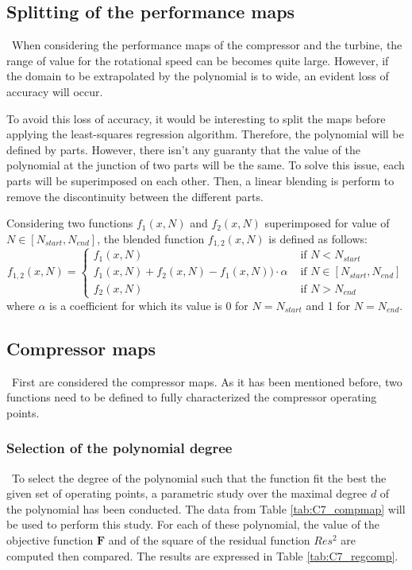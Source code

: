 \subsection{Splitting of the performance maps}
\quad\ When considering the performance maps of the compressor and the turbine, the range of value for the rotational speed can be becomes quite large. However, if the domain to be extrapolated by the polynomial is to wide, an evident loss of accuracy will occur. 

To avoid this loss of accuracy, it would be interesting to split the maps before applying the least-squares regression algorithm. Therefore, the polynomial will be defined by parts. However, there isn't any guaranty that the value of the polynomial at the junction of two parts will be the same. To solve this issue, each parts will be superimposed on each other. Then, a linear blending is perform to remove the discontinuity between the different parts. 

Considering two functions $f_1(x,N)$ and $f_2(x,N)$ superimposed for value of $N\in [N_{start},N_{end}]$, the blended function $f_{1,2}(x,N)$ is defined as follows:
\begin{equation}
 f_{1,2}(x,N) = \begin{cases}
f_1(x,N) &\text{ if }N<N_{start}\\
f_1(x,N) + f_2(x,N) - f_1(x,N))\cdot \alpha &\text{ if } N\in [N_{start},N_{end}]\\
f_2(x,N) &\text{ if }N>N_{end}
\end{cases}   
\end{equation}
where $\alpha$ is a coefficient for which its value is 0 for $N = N_{start}$ and 1 for $N = N_{end}$.  
\subsection{Compressor maps}
\quad\ First are considered the compressor maps. As it has been mentioned before, two functions need to be defined to fully characterized the compressor operating points.  
\subsubsection{Selection of the polynomial degree}
\quad\ To select the degree of the polynomial such that the function fit the best the given set of operating points, a parametric study over the maximal degree $d$ of the polynomial has been conducted. The data from Table \ref{tab:C7_compmap} will be used to perform this study.
For each of these polynomial, the value of the objective function $\textbf{F}$ and of the square of the residual function $Res^2$ are computed then compared. The results are expressed in Table \ref{tab:C7_regcomp}.

